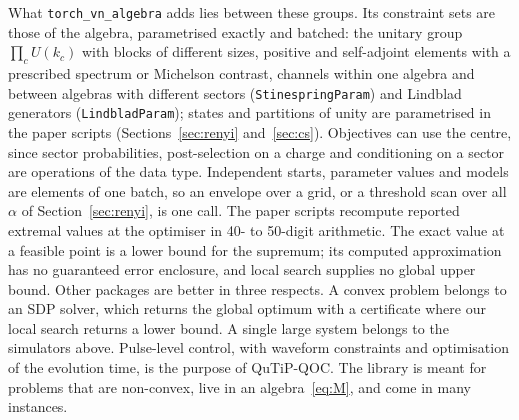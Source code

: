 \documentclass[11pt]{article}
\begin{document}
What \texttt{torch\_vn\_algebra} adds lies between these groups. Its constraint sets are those of the algebra,
parametrised exactly and batched: the unitary group $\prod_cU(k_c)$ with blocks of different sizes, positive and
self-adjoint elements with a prescribed spectrum or Michelson contrast, channels within one algebra and between
algebras with different sectors (\texttt{StinespringParam}) and Lindblad generators (\texttt{LindbladParam}); states
and partitions of unity are parametrised in the paper scripts (Sections~\ref{sec:renyi} and~\ref{sec:cs}). Objectives can use the centre, since sector probabilities, post-selection on a
charge and conditioning on a sector are operations of the data type. Independent starts, parameter values and models
are elements of one batch, so an envelope over a grid, or a threshold scan over all $\alpha$ of
Section~\ref{sec:renyi}, is one call. The paper scripts recompute reported extremal values at the optimiser in 40- to
50-digit arithmetic. The exact value at a feasible point is a lower bound for the supremum; its computed approximation
has no guaranteed error enclosure, and local search supplies no global upper bound. Other packages are better in
three respects. A convex problem belongs to an SDP solver, which returns the global optimum with a certificate where
our local search returns a lower bound. A single large system belongs to the simulators above. Pulse-level control,
with waveform constraints and optimisation of the evolution time, is the purpose of QuTiP-QOC. The library is meant
for problems that are non-convex, live in an algebra~\eqref{eq:M}, and come in many instances.
\end{document}
